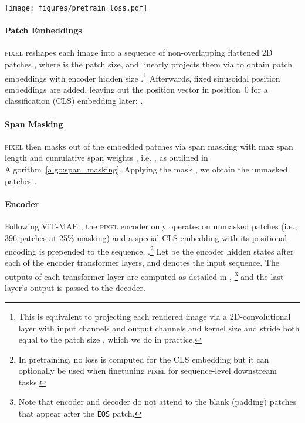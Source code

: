 \documentclass{article}
\newcommand{\model}{\textsc{pixel}\xspace}
\begin{document}
\begin{figure*}[t]
    \centering
    \texttt{[image: figures/pretrain\_loss.pdf]}
    \caption{\model pretraining loss curve}
    \label{fig:training_loss}
\end{figure*}

\paragraph{Patch Embeddings} \model reshapes each image  into a sequence of  non-overlapping flattened 2D patches , where  is the patch size, and linearly projects them via  to obtain patch embeddings  with encoder hidden size .\footnote{This is equivalent to projecting each rendered image  via a 2D-convolutional layer with  input channels and  output channels and kernel size and stride both equal to the patch size , which we do in practice.} Afterwards, fixed sinusoidal position embeddings  are added, leaving out the position vector in position~0 for a classification (CLS) embedding later: .

\paragraph{Span Masking} \model then masks out  of the  embedded patches via span masking with max span length  and cumulative span weights , i.e. , as outlined in Algorithm~\ref{algo:span_masking}. Applying the mask , we obtain the unmasked patches .

\paragraph{Encoder} Following ViT-MAE \citep{he-etal-2022-mae}, the \model encoder only operates on unmasked patches (i.e.,  396 patches at 25\% masking) and a special CLS embedding with its positional encoding  is prepended to the sequence: .\footnote{In pretraining, no loss is computed for the CLS embedding but it can optionally be used when finetuning \model for sequence-level downstream tasks.} Let  be the encoder hidden states after each of the  encoder transformer layers, and  denotes the input sequence. The outputs of each transformer layer are computed as detailed in \citep{DBLP:conf/nips/VaswaniSPUJGKP17}, \footnote{Note that encoder and decoder do not attend to the blank (padding) patches that appear after the {\footnotesize \texttt{EOS}} patch.} and the last layer's output  is passed to the decoder.
\end{document}
